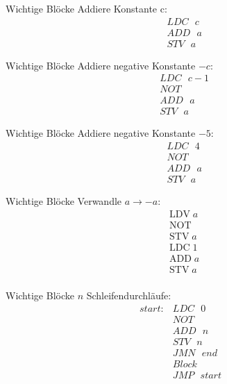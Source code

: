 \begin{frame}{Wichtige Blöcke}
  Addiere Konstante c:
  \begin{align*}
    &LDC\text{ }c\\
    &ADD\text{ }a\\
    &STV\text{ }a
  \end{align*}
\end{frame}

\begin{frame}{Wichtige Blöcke}
  Addiere negative Konstante $-c$:
  \begin{align*}
    &LDC\text{ }c-1\\
    &NOT\\
    &ADD\text{ }a\\
    &STV\text{ }a
  \end{align*}
\end{frame}

\begin{frame}{Wichtige Blöcke}
  Addiere negative Konstante $-5$:
  \begin{align*}
    &LDC\text{ }4\\
    &NOT\\
    &ADD\text{ }a\\
    &STV\text{ }a
  \end{align*}
\end{frame}

\begin{frame}{Wichtige Blöcke}
  Verwandle $a \rightarrow -a$:
  \begin{align*}
    &\text{LDV}\; a\\
    &\text{NOT}\; \\
    &\text{STV}\; a\\
    &\text{LDC}\; 1\\
    &\text{ADD}\; a\\
    &\text{STV}\; a\\
  \end{align*}
\end{frame}

\begin{frame}{Wichtige Blöcke}
  $n$ Schleifendurchläufe:
  \begin{align*}
    start: &LDC\text{ }0\\
    &NOT\\
    &ADD\text{ }n\\
    &STV\text{ }n\\
    &JMN\text{ }end\\
    &Block\\
    &JMP\text{ }start
  \end{align*}
\end{frame}

